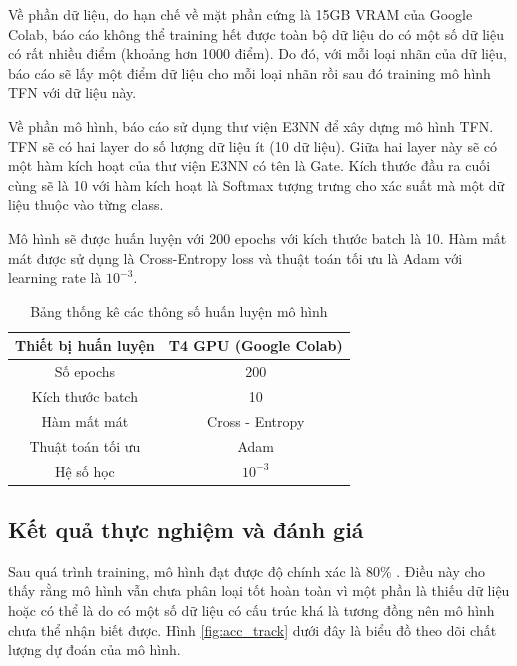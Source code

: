 Về phần dữ liệu, do hạn chế về mặt phần cứng là 15GB VRAM của Google Colab, báo cáo không thể training hết được toàn bộ dữ liệu do có một số dữ liệu có rất nhiều điểm (khoảng hơn 1000 điểm). Do đó, với mỗi loại nhãn của dữ liệu, báo cáo sẽ lấy một điểm dữ liệu cho mỗi loại nhãn rồi sau đó training mô hình TFN với dữ liệu này.

Về phần mô hình, báo cáo sử dụng thư viện E3NN để xây dựng mô hình TFN. TFN sẽ có hai layer do số lượng dữ liệu ít (10 dữ liệu). Giữa hai layer này sẽ có một hàm kích hoạt của thư viện E3NN có tên là Gate. Kích thước đầu ra cuối cùng sẽ là 10 với hàm kích hoạt là Softmax tượng trưng cho xác suất mà một dữ liệu thuộc vào từng class. 

Mô hình sẽ được huấn luyện với 200 epochs với kích thước batch là 10. Hàm mất mát được sử dụng là Cross-Entropy loss và thuật toán tối ưu là Adam với learning rate là $10^{-3}$.

\begin{table}[h!]
\centering
 \begin{tabular}{|c | c |} 
 \hline
    Thiết bị huấn luyện & T4 GPU (Google Colab)\\
 \hline
    Số epochs & 200\\
 \hline
    Kích thước batch & 10\\
 \hline
    Hàm mất mát & Cross - Entropy\\
 \hline
    Thuật toán tối ưu & Adam\\
 \hline
    Hệ số học & $10^{-3}$\\
 \hline
 \end{tabular}
 \caption{Bảng thống kê các thông số huấn luyện mô hình}
\end{table}

\subsection{Kết quả thực nghiệm và đánh giá}
Sau quá trình training, mô hình đạt được độ chính xác là 80\% . Điều này cho thấy rằng mô hình vẫn chưa phân loại tốt hoàn toàn vì một phần là thiếu dữ liệu hoặc có thể là do có một số dữ liệu có cấu trúc khá là tương đồng nên mô hình chưa thể nhận biết được. Hình \ref{fig:acc_track} dưới đây là biểu đồ theo dõi chất lượng dự đoán của mô hình.

